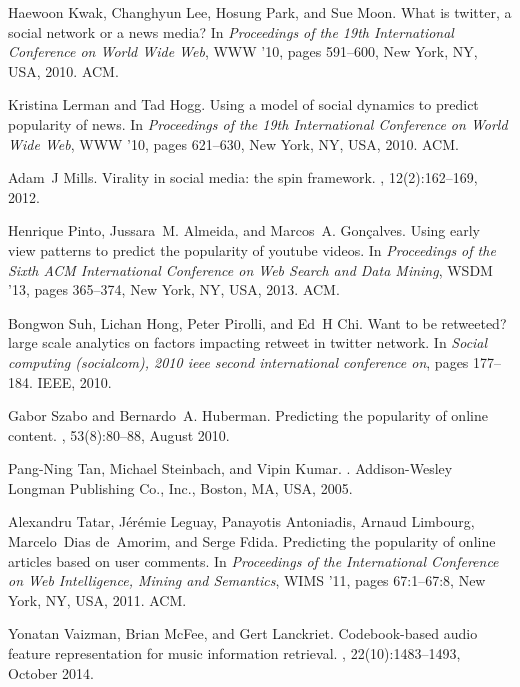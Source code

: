 \documentclass[10pt,letterpaper]{article}
\begin{document}
\begin{thebibliography}{10}
Haewoon Kwak, Changhyun Lee, Hosung Park, and Sue Moon.
\newblock What is twitter, a social network or a news media?
\newblock In {\em Proceedings of the 19th International Conference on World
  Wide Web}, WWW '10, pages 591--600, New York, NY, USA, 2010. ACM.

Kristina Lerman and Tad Hogg.
\newblock Using a model of social dynamics to predict popularity of news.
\newblock In {\em Proceedings of the 19th International Conference on World
  Wide Web}, WWW '10, pages 621--630, New York, NY, USA, 2010. ACM.

Adam~J Mills.
\newblock Virality in social media: the spin framework.
, 12(2):162--169, 2012.

Henrique Pinto, Jussara~M. Almeida, and Marcos~A. Gon\c{c}alves.
\newblock Using early view patterns to predict the popularity of youtube
  videos.
\newblock In {\em Proceedings of the Sixth ACM International Conference on Web
  Search and Data Mining}, WSDM '13, pages 365--374, New York, NY, USA, 2013.
  ACM.

Bongwon Suh, Lichan Hong, Peter Pirolli, and Ed~H Chi.
\newblock Want to be retweeted? large scale analytics on factors impacting
  retweet in twitter network.
\newblock In {\em Social computing (socialcom), 2010 ieee second international
  conference on}, pages 177--184. IEEE, 2010.

Gabor Szabo and Bernardo~A. Huberman.
\newblock Predicting the popularity of online content.
, 53(8):80--88, August 2010.

Pang-Ning Tan, Michael Steinbach, and Vipin Kumar.
.
\newblock Addison-Wesley Longman Publishing Co., Inc., Boston, MA, USA, 2005.

Alexandru Tatar, J{\'e}r{\'e}mie Leguay, Panayotis Antoniadis, Arnaud Limbourg,
  Marcelo~Dias de~Amorim, and Serge Fdida.
\newblock Predicting the popularity of online articles based on user comments.
\newblock In {\em Proceedings of the International Conference on Web
  Intelligence, Mining and Semantics}, WIMS '11, pages 67:1--67:8, New York,
  NY, USA, 2011. ACM.

Yonatan Vaizman, Brian McFee, and Gert Lanckriet.
\newblock Codebook-based audio feature representation for music information
  retrieval.
,
  22(10):1483--1493, October 2014.


\end{thebibliography}
\end{document}
